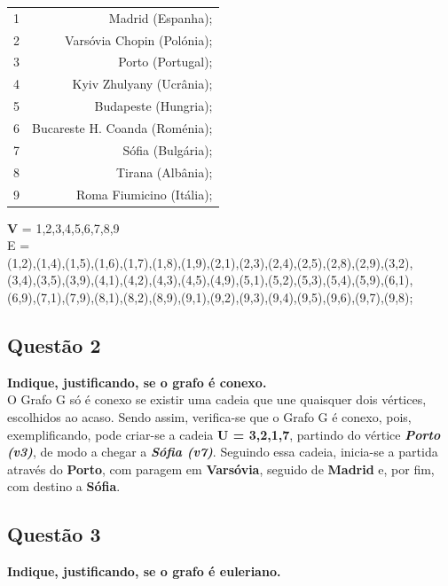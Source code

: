 \documentclass{report}
\begin{document}
\begin{center}
\begin{table}[h]
\centering
\begin{tabular}{r|r}
 1 & Madrid (Espanha); \\
 2 & Varsóvia Chopin (Polónia); \\ 
 3 & Porto (Portugal); \\
 4 & Kyiv Zhulyany (Ucrânia); \\
 5 & Budapeste (Hungria); \\
 6 & Bucareste H. Coanda (Roménia); \\
 7 & Sófia (Bulgária); \\
 8 & Tirana (Albânia); \\
 9 & Roma Fiumicino (Itália); 
 \end{tabular}
 \end{table}
 \end{center}
\textbf{V} = {1,2,3,4,5,6,7,8,9} \\
E = \\ (1,2),(1,4),(1,5),(1,6),(1,7),(1,8),(1,9),(2,1),(2,3),(2,4),(2,5),(2,8),(2,9),(3,2),\\(3,4),(3,5),(3,9),(4,1),(4,2),(4,3),(4,5),(4,9),(5,1),(5,2),(5,3),(5,4),(5,9),(6,1),\\(6,9),(7,1),(7,9),(8,1),(8,2),(8,9),(9,1),(9,2),(9,3),(9,4),(9,5),(9,6),(9,7),(9,8); 


\subsection{Questão 2} 
\textbf{Indique, justificando, se o grafo é conexo.} \cite{antero_2007}\\ 

O Grafo G só é conexo se existir uma cadeia que une quaisquer dois vértices, escolhidos ao acaso. Sendo assim, verifica-se que o Grafo G é conexo, pois, exemplificando, pode criar-se a cadeia \textbf{U = {3,2,1,7}}, partindo do vértice \textit{\textbf{Porto (v3)}}, de modo a chegar a \textit{\textbf{Sófia (v7)}}. Seguindo essa cadeia, inicia-se a partida através do \textbf{Porto}, com paragem em \textbf{Varsóvia}, seguido de \textbf{Madrid} e, por fim, com destino a \textbf{Sófia}.


\subsection{Questão 3}
\textbf{Indique, justificando, se o grafo é euleriano.} \\
\end{document}

